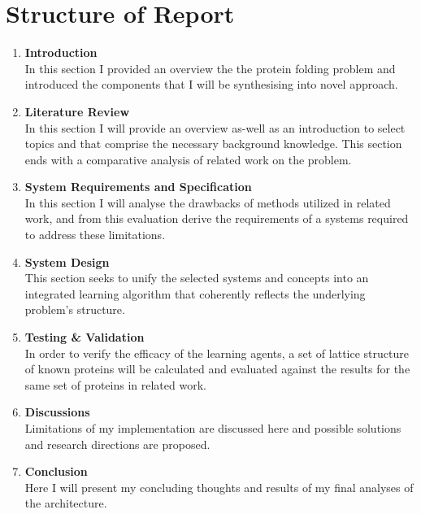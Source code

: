 \section{Structure of Report}
  \begin{enumerate}
      \item \textbf{Introduction} \\
         In this section I provided an overview the the protein folding problem and
         introduced the components that I will be synthesising into novel approach.
      \item \textbf{Literature Review} \\
         In this section I will provide an overview as-well as an introduction
         to select topics and that comprise the necessary background knowledge. 
         This section ends with a comparative analysis of related work on the problem.
      \item \textbf{System Requirements and Specification} \\
         In this section I will analyse the drawbacks of methods utilized in related work,
         and from this evaluation derive the requirements of a systems
         required to address these limitations.
      \item \textbf{System Design}\\
         This section seeks to unify the selected systems and concepts
         into an integrated learning algorithm that coherently reflects
         the underlying problem's structure. 
      \item \textbf{Testing \& Validation} \\
         In order to verify the efficacy of the learning agents,
         a set of lattice structure of known proteins will be calculated
         and evaluated against the results for the same set of
         proteins in related work.
      \item  \textbf{Discussions} \\
         Limitations of my implementation are discussed here and
         possible solutions and research directions are proposed.
      \item  \textbf{Conclusion} \\
         Here I will present my concluding thoughts and results
         of my final analyses of the architecture.
  \end{enumerate}

